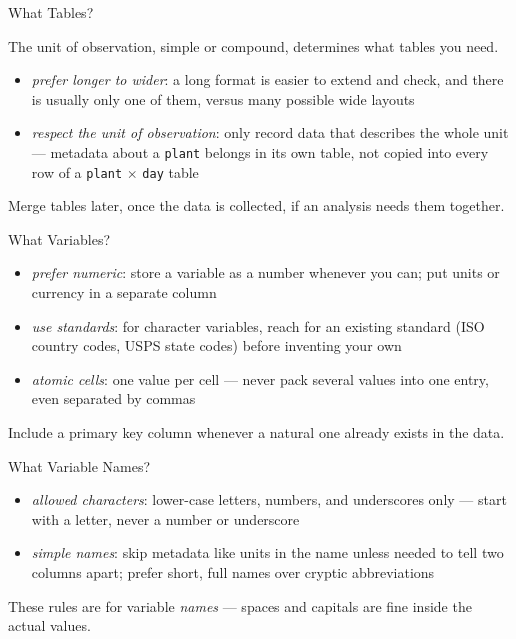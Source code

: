 \documentclass[8pt,aspectratio=169]{beamer}
\begin{document}
\begin{textframe}{What Tables?}

The unit of observation, simple or compound, determines what tables you need.

\begin{itemize}
\item \textit{prefer longer to wider}: a long format is easier to extend and check, and there is usually only one of them, versus many possible wide layouts
\item \textit{respect the unit of observation}: only record data that describes the whole unit --- metadata about a \texttt{plant} belongs in its own table, not copied into every row of a \texttt{plant} $\times$ \texttt{day} table
\end{itemize}

Merge tables later, once the data is collected, if an analysis needs them together.

\end{textframe}

\begin{textframe}{What Variables?}

\begin{itemize}
\item \textit{prefer numeric}: store a variable as a number whenever you can; put units or currency in a separate column
\item \textit{use standards}: for character variables, reach for an existing standard (ISO country codes, USPS state codes) before inventing your own
\item \textit{atomic cells}: one value per cell --- never pack several values into one entry, even separated by commas
\end{itemize}

Include a primary key column whenever a natural one already exists in the data.

\end{textframe}

\begin{textframe}{What Variable Names?}

\begin{itemize}
\item \textit{allowed characters}: lower-case letters, numbers, and underscores only --- start with a letter, never a number or underscore
\item \textit{simple names}: skip metadata like units in the name unless needed to tell two columns apart; prefer short, full names over cryptic abbreviations
\end{itemize}

These rules are for variable \textit{names} --- spaces and capitals are fine inside the actual values.

\end{textframe}
\end{document}
